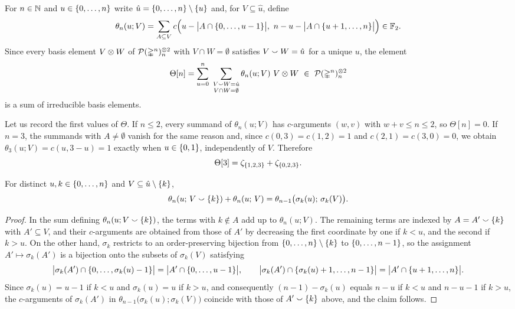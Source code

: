 \documentclass{amsart}
\begin{document}
For $n \in \N$ and $u \in \set{0, \dots, n}$ write $\hat{u} = \set{0, \dots, n} \setminus \set{u}$ and, for $V \subseteq \hat u$, define
\[
\theta_n(u; V) =
\sum_{A \subseteq V} c\Big(u - \bars[\big]{A \cap \set{0, \dots, u-1}},\ n - u - \bars[\big]{A \cap \set{u+1, \dots, n}}\Big) \in \F.
\]
Since every basis element $V \ot W$ of $\cP(\simplex^n)^{\ot 2}_{n}$ with $V \cap W = \emptyset$ satisfies $V \union W = \hat u$ for a unique $u$, the element
\[
\Theta[n] =
\sum_{u = 0}^{n} \ \sum_{\substack{V \union W = \hat{u} \\ V \cap W = \emptyset}} \theta_n(u; V)\ V \ot W \ \in \ \cP(\simplex^n)^{\ot 2}_{n}
\]
is a sum of irreducible basis elements.

Let us record the first values of $\Theta$.
If $n \leq 2$, every summand of $\theta_n(u;V)$ has $c$-arguments $(w,v)$ with $w + v \leq n \leq 2$, so $\Theta[n] = 0$.
If $n = 3$, the summands with $A \neq \emptyset$ vanish for the same reason and, since $c(0,3) = c(1,2) = 1$ and $c(2,1) = c(3,0) = 0$, we obtain $\theta_3(u;V) = c(u, 3-u) = 1$ exactly when $u \in \set{0,1}$, independently of $V$.
Therefore
\begin{equation}\label{eq:theta_3}
	\Theta[3] = \zeta_{\set{1,2,3}} + \zeta_{\set{0,2,3}}.
\end{equation}

\begin{lemma}\label{l:theta_derivative}
	For distinct $u, k \in \set{0, \dots, n}$ and $V \subseteq \hat{u} \setminus \set{k}$,
	\[
	\theta_n(u;\, V \union \set{k}) + \theta_n(u;\, V) =
	\theta_{n-1}\big(\sigma_k(u);\, \sigma_k(V)\big).
	\]
\end{lemma}

\begin{proof}
	In the sum defining $\theta_n(u; V \union \set{k})$, the terms with $k \notin A$ add up to $\theta_n(u; V)$.
	The remaining terms are indexed by $A = A' \union \set{k}$ with $A' \subseteq V$, and their $c$-arguments are obtained from those of $A'$ by decreasing the first coordinate by one if $k < u$, and the second if $k > u$.
	On the other hand, $\sigma_k$ restricts to an order-preserving bijection from $\set{0, \dots, n} \setminus \set{k}$ to $\set{0, \dots, n-1}$, so the assignment $A' \mapsto \sigma_k(A')$ is a bijection onto the subsets of $\sigma_k(V)$ satisfying
	\[
	\bars[\big]{\sigma_k(A') \cap \set{0, \dots, \sigma_k(u) - 1}} = \bars[\big]{A' \cap \set{0, \dots, u - 1}},
	\qquad
	\bars[\big]{\sigma_k(A') \cap \set{\sigma_k(u) + 1, \dots, n-1}} = \bars[\big]{A' \cap \set{u+1, \dots, n}}.
	\]
	Since $\sigma_k(u) = u - 1$ if $k < u$ and $\sigma_k(u) = u$ if $k > u$, and consequently $(n-1) - \sigma_k(u)$ equals $n - u$ if $k < u$ and $n - u - 1$ if $k > u$, the $c$-arguments of $\sigma_k(A')$ in $\theta_{n-1}\big(\sigma_k(u); \sigma_k(V)\big)$ coincide with those of $A' \union \set{k}$ above, and the claim follows.
\end{proof}
\end{document}
